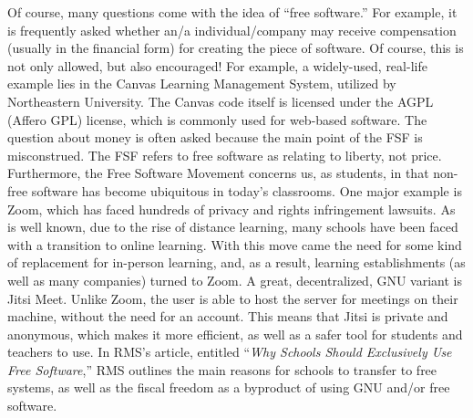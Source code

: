 \documentclass[12pt]{article}
\begin{document}
\begin{multicols}{3}
Of course, many questions come with the idea of “free software.” For example, it is frequently asked whether an/a individual/company may receive compensation (usually in the financial form) for creating the piece of software. Of course, this is not only allowed, but also encouraged! For example, a widely-used, real-life example lies in the Canvas Learning Management System, utilized by Northeastern University. The Canvas code itself is licensed under the AGPL (Affero GPL) license, which is commonly used for web-based software. The question about money is often asked because the main point of the FSF is misconstrued. The FSF refers to free software as relating to liberty, not price. Furthermore, the Free Software Movement concerns us, as students, in that non-free software has become ubiquitous in today's classrooms. One major example is Zoom, which has faced hundreds of privacy and rights infringement lawsuits. As is well known, due to the rise of distance learning, many schools have been faced with a transition to online learning. With this move came the need for some kind of replacement for in-person learning, and, as a result, learning establishments (as well as many companies) turned to Zoom. A great, decentralized, GNU variant is Jitsi Meet. Unlike Zoom, the user is able to host the server for meetings on their machine, without the need for an account. This means that Jitsi is private and anonymous, which makes it more efficient, as well as a safer tool for students and teachers to use. In RMS's article, entitled “\textit{Why Schools Should Exclusively Use Free Software},” RMS outlines the main reasons for schools to transfer to free systems, as well as the fiscal freedom as a byproduct of using GNU and/or free software. 


\end{multicols}
\end{document}
